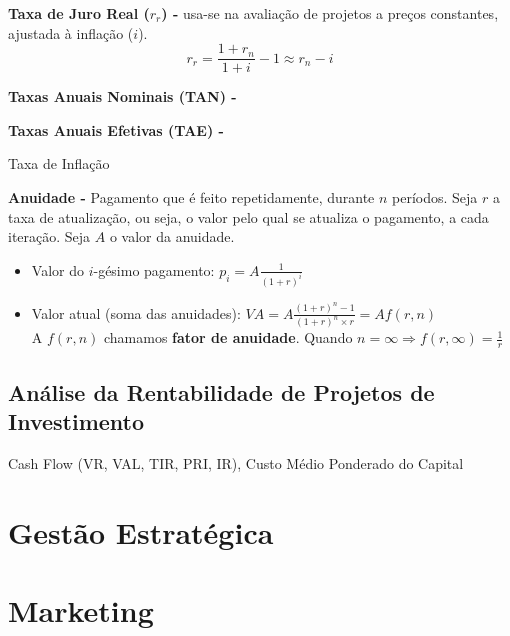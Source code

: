 \documentclass[11pt]{article}
\begin{document}
\textbf{Taxa de Juro Real ($r_r$) -} usa-se na avaliação de projetos a preços constantes, ajustada à inflação ($i$).
\begin{equation*}
    r_r = \frac{1+r_n}{1+i} - 1 \approx r_n - i
\end{equation*}

\textbf{Taxas Anuais Nominais (TAN) -}

\textbf{Taxas Anuais Efetivas (TAE) -}

Taxa de Inflação

\textbf{Anuidade -} Pagamento que é feito repetidamente, durante $n$ períodos. Seja $r$ a taxa de atualização, ou seja, o valor pelo qual se atualiza o pagamento, a cada iteração. Seja $A$ o valor da anuidade.
\begin{itemize}[topsep=0pt]
    \item Valor do $i$-gésimo pagamento: $\displaystyle p_i=A\frac{1}{(1+r)^i}$
    \item Valor atual (soma das anuidades): $\displaystyle VA=A\frac{(1+r)^n-1}{(1+r)^n\times r}=Af(r,n)$\\[6pt]
          A $f(r,n)$ chamamos \textbf{fator de anuidade}. Quando $\displaystyle n = \infty \Rightarrow f(r,\infty)=\frac{1}{r}$
\end{itemize}

\subsection{Análise da Rentabilidade de Projetos de Investimento}

Cash Flow (VR, VAL, TIR, PRI, IR), Custo Médio Ponderado do Capital

\newpage

\section{Gestão Estratégica}

\section{Marketing}
\end{document}
